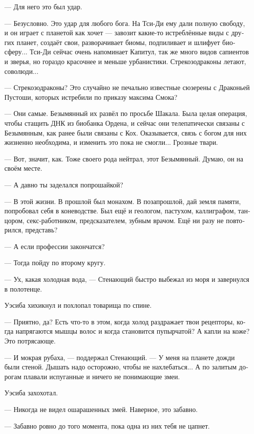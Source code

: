 \documentclass[a4paper,12pt,fleqn]{book}\usepackage{cooltooltips}\usepackage{polyglossia}\setdefaultlanguage[babelshorthands=true]{russian}\setotherlanguage{english}\defaultfontfeatures{Ligatures=TeX,Mapping=tex-text} \usepackage{xcolor}\definecolor{lightgray}{HTML}{bbbbbb}\color{lightgray}\newcommand{\ml}[3]{\textenglish{\textcolor{black}{#3}}}
\newcommand{\asterism}{\vspace{1em}{\centering\Large\bfseries$\ast~\ast~\ast$\par}\vspace{1em}}
\begin{document}
--- Для него это был удар.

--- Безусловно.
Это удар для любого бога.
На Тси-Ди ему дали полную свободу, и он играет с планетой как хочет --- завозит какие-то истреблённые виды с других планет, создаёт свои, разворачивает биомы, подпиливает и шлифует биосферу...
Тси-Ди сейчас очень напоминает Капитул, так же много видов сапиентов и зверья, но гораздо красочнее и меньше урбанистики.
Стрекозодраконы летают, соволюди...

--- Стрекозодраконы?
Это случайно не печально известные сюзерены с Драконьей Пустоши, которых истребили по приказу максима Смока?

--- Они самые.
Безымянный их развёл по просьбе Шакала.
Была целая операция, чтобы стащить ДНК из биобанка Ордена, и сейчас они телепатически связаны с Безымянным, как ранее были связаны с Кох.
Оказывается, связь с богом для них жизненно необходима, и изменить это пока не смогли...
Грозные твари.

--- Вот, значит, как.
Тоже своего рода нейтрал, этот Безымянный.
Думаю, он на своём месте.

--- А давно ты заделался попрошайкой?

--- В этой жизни.
В прошлой был монахом.
В позапрошлой, дай земля памяти, попробовал себя в коневодстве.
Был ещё и геологом, пастухом, каллиграфом, танцором, секс-работником, предсказателем, зубным врачом.
Ещё ни разу не повторился, представь?

--- А если профессии закончатся?

--- Тогда пойду по второму кругу.

\asterism

--- Ух, какая холодная вода, --- Стенающий быстро выбежал из моря и завернулся в полотенце.

Уэсиба хихикнул и похлопал товарища по спине.

--- Приятно, да?
Есть что-то в этом, когда холод раздражает твои рецепторы, когда напрягаются мышцы волос и когда становится пупырчатой?
А капли на коже?
Это потрясающе.

--- И мокрая рубаха, --- поддержал Стенающий.
--- У меня на планете дожди были стеной.
Дышать надо осторожно, чтобы не нахлебаться...
А по залитым дорогам плавали испуганные и ничего не понимающие змеи.

Уэсиба захохотал.

--- Никогда не видел ошарашенных змей.
Наверное, это забавно.

--- Забавно ровно до того момента, пока одна из них тебя не цапнет.
\end{document}
